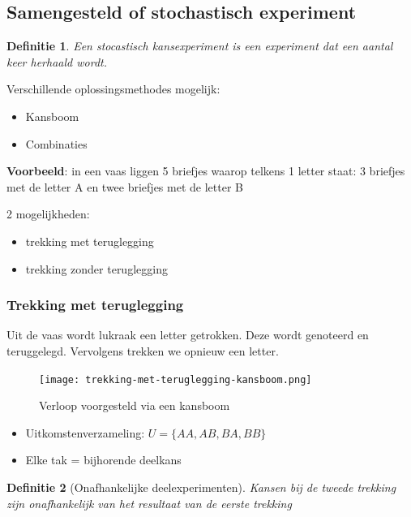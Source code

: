 \documentclass{article}
\newtheorem{theorem}{Definitie}[section]
\begin{document}
\subsection{Samengesteld of stochastisch experiment}

\begin{theorem}
    Een stocastisch kansexperiment is een experiment dat een aantal keer herhaald wordt.
\end{theorem}

Verschillende oplossingsmethodes mogelijk:

\begin{itemize}
    \item Kansboom
    \item Combinaties
\end{itemize}

\textbf{Voorbeeld}: in een vaas liggen 5 briefjes waarop telkens 1 letter staat: 3 briefjes met de letter A en twee briefjes met de letter B

2 mogelijkheden: 

\begin{itemize}
    \item trekking met teruglegging
    \item trekking zonder teruglegging
\end{itemize}

\subsubsection{Trekking met teruglegging}

Uit de vaas wordt lukraak een letter getrokken. Deze wordt genoteerd
en teruggelegd. Vervolgens trekken we opnieuw een letter.

\begin{figure}[H]
    \centering
    \texttt{[image: trekking-met-teruglegging-kansboom.png]}
    \caption{Verloop voorgesteld via een kansboom}
\end{figure}

\begin{itemize}
    \item Uitkomstenverzameling: $U = \{AA, AB, BA, BB\}$
    \item Elke tak = bijhorende deelkans
\end{itemize}

\begin{theorem}[Onafhankelijke deelexperimenten]
    Kansen bij de tweede trekking zijn onafhankelijk van het resultaat van de eerste trekking
\end{theorem}
\end{document}
